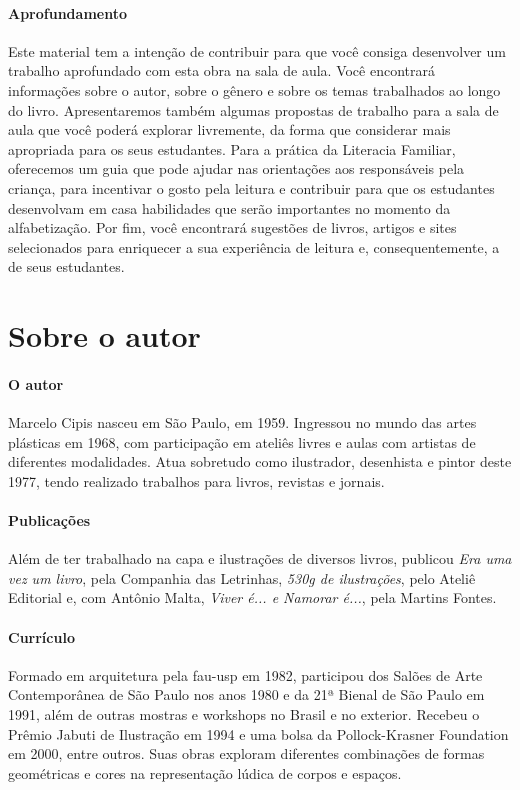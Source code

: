 \documentclass[11pt]{extarticle}
\begin{document}
\paragraph{Aprofundamento} 
Este material tem a intenção de contribuir para que você consiga desenvolver um trabalho aprofundado 
com esta obra na sala de aula. Você encontrará informações sobre o autor, sobre 
o gênero e sobre os temas trabalhados ao longo do livro. Apresentaremos também 
algumas propostas de trabalho para a sala de aula que você poderá explorar livremente, 
da forma que considerar mais apropriada para os seus estudantes. Para a prática 
da Literacia Familiar, oferecemos um guia que pode ajudar nas orientações aos 
responsáveis pela criança, para incentivar o gosto pela leitura e contribuir para 
que os estudantes desenvolvam em casa habilidades que serão importantes no momento 
da alfabetização. Por fim, você encontrará sugestões de livros, artigos e sites 
selecionados para enriquecer a sua experiência de leitura e, 
consequentemente, a de seus estudantes.


\section{Sobre o autor}


\paragraph{O autor} 
Marcelo Cipis nasceu em São Paulo, em 1959. 
Ingressou no mundo das artes plásticas em 1968, com participação em ateliês 
livres e aulas com artistas de diferentes modalidades. Atua sobretudo como 
ilustrador, desenhista e pintor deste 1977, tendo realizado trabalhos para 
livros, revistas e jornais.
\paragraph{Publicações} 
Além de ter trabalhado na capa e ilustrações de diversos livros, 
publicou \emph{Era uma vez um livro}, pela Companhia das Letrinhas, \emph{530g de ilustrações}, pelo Ateliê Editorial e, com Antônio Malta, \emph{Viver é... e Namorar é...}, pela Martins Fontes.
\paragraph{Currículo} 
Formado em arquitetura pela fau-usp em 1982, participou dos Salões de Arte 
Contemporânea de São Paulo nos anos 1980 e da 21ª Bienal de São Paulo em 1991, 
além de outras mostras e workshops no Brasil e no exterior. Recebeu o Prêmio 
Jabuti de Ilustração em 1994 e uma bolsa da Pollock-Krasner Foundation em 2000, 
entre outros. Suas obras exploram diferentes combinações de formas geométricas 
e cores na representação lúdica de corpos e espaços.
\end{document}
